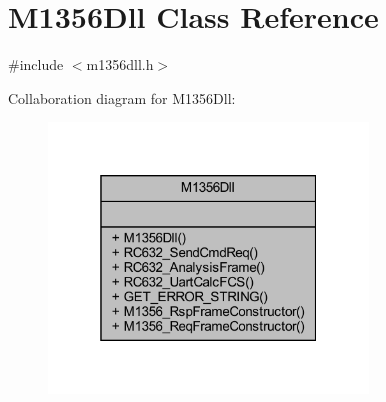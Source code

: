 \hypertarget{class_m1356_dll}{}\section{M1356\+Dll Class Reference}
\label{class_m1356_dll}


{\ttfamily \#include $<$m1356dll.\+h$>$}



Collaboration diagram for M1356\+Dll\+:
\nopagebreak
\begin{figure}[H]
\begin{center}
\leavevmode
\includegraphics[width=241pt]{class_m1356_dll__coll__graph}
\end{center}
\end{figure}
